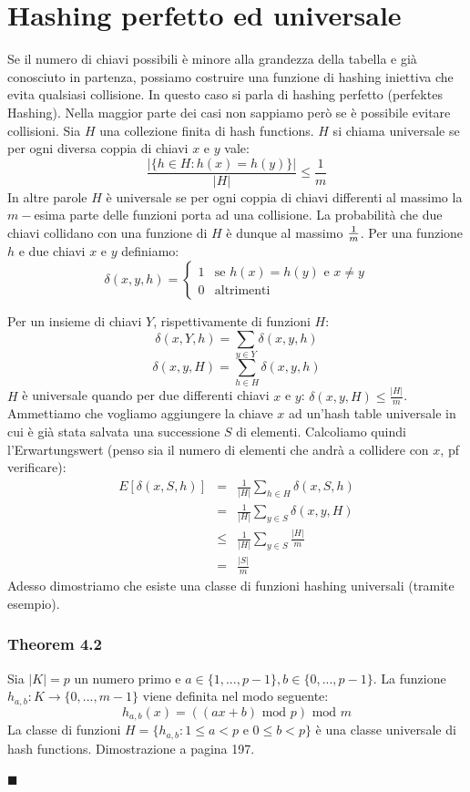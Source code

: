 \documentclass[a4paper]{book}
\newenvironment{mytheorem}[1]{\subsubsection*{Theorem #1}}{\begin{flushright}$\blacksquare$\end{flushright}}
\begin{document}
\section{Hashing perfetto ed universale}
Se il numero di chiavi possibili è minore alla grandezza della tabella e già conosciuto in partenza, possiamo costruire una funzione di hashing iniettiva che evita qualsiasi collisione. In questo caso si parla di hashing perfetto (perfektes Hashing).
Nella maggior parte dei casi non sappiamo però se è possibile evitare collisioni. Sia $H$ una collezione finita di hash functions. $H$ si chiama universale se per ogni diversa coppia di chiavi $x$ e $y$ vale:
$$ \frac{\left|\{h\in H: h(x)=h(y)\}\right|}{|H|} \leq \frac{1}{m}$$
In altre parole $H$ è universale se per ogni coppia di chiavi differenti al massimo la $m-$esima parte delle funzioni porta ad una collisione. La probabilità che due chiavi collidano con una funzione di $H$ è dunque al massimo $1\over m$. Per una funzione $h$ e due chiavi $x$ e $y$ definiamo:
\[
\delta (x,y,h) = \begin{cases} 1 & \mbox{se }h(x)=h(y)\mbox{ e } x\neq y  \\
0 & \mbox{altrimenti}\end{cases}
\]

Per un insieme di chiavi $Y$, rispettivamente di funzioni $H$:
$$\delta (x,Y,h)= \sum_{y \in Y} \delta (x,y,h)$$
$$\delta (x,y,H)= \sum_{h \in H} \delta (x,y,h)$$
$H$ è universale quando per due differenti chiavi $x$ e $y$: $\delta (x,y,H) \leq \frac{|H|}{m}$.
Ammettiamo che vogliamo aggiungere la chiave $x$ ad un'hash table universale in cui è già stata salvata una successione $S$ di elementi. Calcoliamo quindi l'Erwartungswert (penso sia il numero di elementi che andrà a collidere con $x$, pf verificare):
\begin{eqnarray}
E[\delta (x,S,h)] &=& \frac{1}{|H|} \sum_{h \in H} \delta (x,S,h) \nonumber \\
&=& \frac{1}{|H|} \sum_{y \in S} \delta (x,y,H) \nonumber \\
&\leq & \frac{1}{|H|} \sum_{y \in S} \frac{|H|}{m} \nonumber \\
&=& \frac{|S|}{m}
\end{eqnarray}
Adesso dimostriamo che esiste una classe di funzioni hashing universali (tramite esempio).
\begin{mytheorem}{4.2}
Sia $|K|=p$ un numero primo e $a \in \{1, ..., p-1\},b \in \{0, ..., p-1\}$. La funzione $h_{a,b}: K \rightarrow \{0, ..., m-1\}$ viene definita nel modo seguente:
$$ h_{a,b}(x)=((ax+b) \mbox{ mod } p) \mbox{ mod } m$$
La classe di funzioni $H=\{h_{a,b} : 1\leq a < p \mbox{ e } 0\leq b <p\}$ è una classe universale di hash functions. Dimostrazione a pagina 197.
\end{mytheorem}
\end{document}
